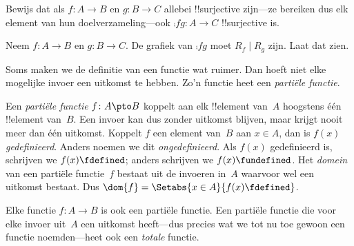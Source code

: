 \documentclass[openany]{memoir}
\begin{document}
\begin{prob}
Bewijs dat als $f \colon A \to B$ en $g \colon B \to C$ allebei
!!{surjective} zijn---ze bereiken dus elk element van hun
doelverzameling---ook $\comp{f}{g}\colon A \to C$ !!{surjective} is.
\end{prob}

\begin{prob}
Neem $f \colon A \to B$ en $g \colon B \to C$. De grafiek van
$\comp{f}{g}$ moet $R_f \mid R_g$ zijn. Laat dat zien.
\end{prob}
\endgroup

\begingroup
\def\olfilename{OLP-0026}
\def\olfilepath{content/sets-functions-relations/functions/}
\hypertarget{unit-OLP-0026}{}






\begin{explain}
Soms maken we de definitie van een functie wat ruimer. Dan hoeft niet
elke mogelijke invoer een uitkomst te hebben. Zo'n functie heet een
\emph{partiële functie}.
\end{explain}

\begin{defn}
Een \emph{partiële functie} $f \colon A \pto B$ koppelt aan elk
!!{element} van~$A$ hoogstens één !!{element} van~$B$. Een invoer kan
dus zonder uitkomst blijven, maar krijgt nooit meer dan één uitkomst. Koppelt $f$ een
element van~$B$ aan $x \in A$, dan is $f(x)$ \emph{gedefinieerd}.
Anders noemen we dit \emph{ongedefinieerd}. Als $f(x)$ gedefinieerd
is, schrijven we $f(x) \fdefined$; anders schrijven we $f(x)
\fundefined$. Het \emph{domein} van een partiële functie~$f$ bestaat
uit de invoeren in~$A$ waarvoor wel een uitkomst bestaat. Dus
$\dom{f} = \Setabs{x \in A}{f(x) \fdefined}$.
\end{defn}

\begin{ex}
Elke functie $f\colon A \to B$ is ook een partiële functie. Een
partiële functie die voor elke invoer uit~$A$ een uitkomst heeft---dus
precies wat we tot nu toe gewoon een functie noemden---heet ook een
\emph{totale} functie.
\end{ex}
\end{document}
